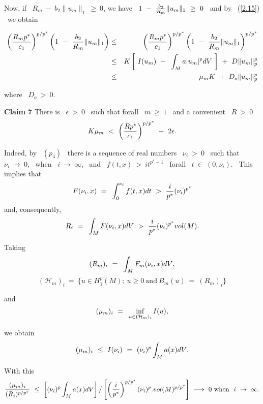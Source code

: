 \documentclass[12pt]{article}
\begin{document}
Now, if \ $R_m \ - \ b_2\|u_m\|_1 \ \geq \ 0$, we have \ $1  \ - \ {\displaystyle}\frac{b_2}{R_m}\|u_m\|_1 
\ \geq \ 0$ \ and by \ (\ref{2.15}) \ we obtain
\vspace{-0.5cm}

\begin{eqnarray}
\label{2.16}
\left({\displaystyle}\frac{R_mp^{\ast}}{c_1}\right)^{p/p^{\ast}}\left(1 \ - \ {\displaystyle}\frac{b_2}{R_m}\|u_m\|_1\right) 
& \leq & \left({\displaystyle}\frac{R_mp^{\ast}}{c_1}\right)^{p/p^{\ast}}\left(1 \ - \ {\displaystyle}\frac{b_2}{R_m}\|u_m\|_1\right)^{p/p^{\ast}}
 \nonumber \\
 & \leq & K\left[ \ I(u_m) \ - \ {\displaystyle}\int_M{a|u_m|^pdV} \ \right] \ + \ D\|u_m\|^p_p \nonumber \\
 & \leq & \mu_m K \ + \ D_o\|u_m\|^p_p
\end{eqnarray}

\noindent  where \ $D_o \ > \ 0$.
 
{\bf Claim 7}
There is \ $\epsilon \ > \ 0$ \ such that forall \ $m \ \geq \ 1$ \ and a convenient \ $R \ > \ 0$  
$$K\mu_m \ < \ \left({\displaystyle}\frac{Rp^{\ast}}{c_1}\right)^{p/p^{\ast}} \ - \ 2\epsilon.$$ 

Indeed, by \ $(p_4)$ \ there is a sequence of real numbers \ $\nu_i \ > \ 0$ \ such that \ $\nu_i
 \ \rightarrow \ 0$, \ when \ $i \ \rightarrow \ \infty$, \ and \ $f(t,x) \ > \ it^{p^{\ast}-1}$ \ forall
 \ $t \ \in \ (0,\nu_i)$. \ This implies that 
$$F(\nu_i,x) \ = \ {\displaystyle}\int_0^{\nu_i}{f(t,x)dt} \ > \ {\displaystyle}\frac{i}{p^{\ast}}(\nu_i)^{p^{\ast}}$$
and, consequently,
$$R_i \ = \ {\displaystyle}\int_M{F(\nu_i,x)dV} \ > \ {\displaystyle}\frac{i}{p^{\ast}}(\nu_i)^{p^{\ast}}vol(M).$$

Taking
$$(R_m)_i \ = \ {\displaystyle}\int_M{F_m(\nu_i,x)dV},$$ 
\vspace{-0.5mm}
$$(\mathcal{H}_m)_i \ = \ \{u \in  H^p_1(M);\ u \geq 0 \ \mbox{and} \ B_m(u)\ = \ (R_m)_i \}$$

\noindent  and 
\vspace{-0.5mm}
$$(\mu_m)_i \ = \ {\displaystyle}\inf_{u \in (\mathcal{H}_m)_i}{I(u)},$$

\noindent  we obtain
\vspace{-0.5mm}
$$(\mu_m)_i \ \leq \ I(\nu_i) \ = \ (\nu_i)^p{\displaystyle}\int_M{a(x)dV}.$$ 

With this
\vspace{-0.5mm} 
$$ {\displaystyle}\frac{(\mu_m)_i}{(R_i)^{p/p^{\ast}}} \ \leq \ \left[(\nu_i)^p\int_M{a(x)dV}\right] 
/\left[\left(\frac{i}{p^{\ast}}\right)^{p/p^{\ast}}(\nu_i)^p.vol(M)^{p/p^{\ast}}\right] \ \longrightarrow
 \ 0 \ \mbox{when} \ \ i \ \rightarrow \ \infty .$$
\end{document}
